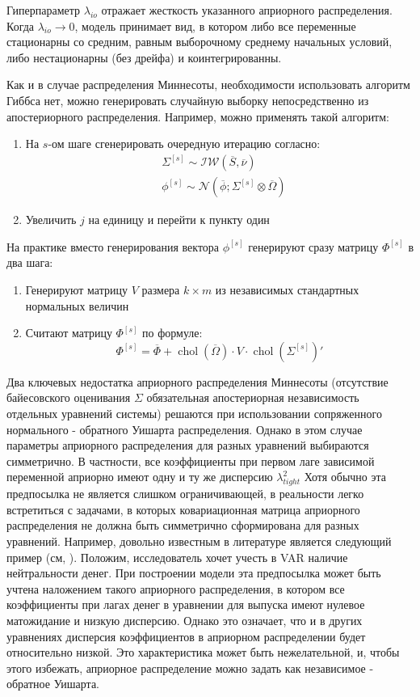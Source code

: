 \documentclass[11pt]{article} %
\DeclareMathOperator{\chol}{chol}
\newcommand{\cN}{\mathcal{N}}
\newcommand{\cIW}{\mathcal{IW}}
\newcommand{\post}{\overline}
\begin{document}
Гиперпараметр $\lambda_{io}$ отражает жесткость указанного априорного распределения. Когда $\lambda_{io}\to 0 $,  модель принимает вид, в котором либо все переменные стационарны со средним, равным выборочному среднему начальных условий, либо нестационарны (без дрейфа) и коинтегрированны. 


Как и в случае распределения Миннесоты, необходимости использовать алгоритм Гиббса нет, можно генерировать случайную выборку непосредственно из апостериорного распределения. Например, можно применять такой алгоритм:


\begin{enumerate}
\item На $s$-ом шаге сгенерировать очередную итерацию согласно:
\begin{align*}
&\Sigma^{[s]} \sim \cIW(\post S, \post \nu) \\
&\phi^{[s]}\sim \cN(\post \phi; \Sigma^{[s]} \otimes \post \Omega)
\end{align*}
\item Увеличить $j$ на единицу и перейти к пункту один
\end{enumerate}

На практике вместо генерирования вектора $\phi^{[s]}$ генерируют сразу матрицу $\Phi^{[s]}$ в два шага:

\begin{enumerate}
\item Генерируют матрицу $V$ размера $k\times m$  из независимых стандартных нормальных величин
\item Считают матрицу $\Phi^{[s]}$ по формуле:
\[
\Phi^{[s]} = \post \Phi + \chol(\post\Omega) \cdot V \cdot \chol(\Sigma^{[s]})'
\]
\end{enumerate}

Два ключевых недостатка априорного распределения Миннесоты (отсутствие байесовского оценивания $\Sigma$ обязательная апостериорная независимость отдельных уравнений системы) решаются при использовании сопряженного нормального  - обратного Уишарта распределения. Однако в этом случае параметры априорного распределения для разных уравнений выбираются симметрично. В частности, все коэффициенты при первом лаге зависимой переменной априорно имеют одну и ту же дисперсию $\lambda_{tight}^2$  Хотя обычно эта предпосылка не является слишком ограничивающей, в реальности легко встретиться с задачами, в которых ковариационная матрица априорного распределения не должна быть симметрично сформирована для разных уравнений. Например, довольно известным в литературе является следующий пример (см, \cite{kadiyala_karlsson_1997}). Положим, исследователь хочет  учесть в VAR наличие нейтральности денег. При построении модели эта предпосылка может быть учтена наложением такого априорного распределения, в котором все коэффициенты при лагах денег в уравнении для выпуска имеют нулевое матожидание и низкую дисперсию. Однако это означает, что и в других уравнениях дисперсия коэффициентов в априорном распределении будет относительно низкой. Это характеристика может быть нежелательной, и, чтобы этого избежать,   априорное распределение можно задать как независимое - обратное Уишарта. 
\end{document}
